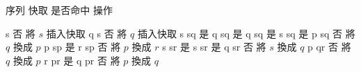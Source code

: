 
\bTABLE[
    align={middle,lohi},
    split=yes,
    header=repeat,
    offset=.25em,
]

\setupTABLE[column][1][leftframe=off]
\setupTABLE[column][-1][rightframe=off]
\setupTABLE[row][each][topframe=off,bottomframe=off]
\setupTABLE[header][each][bottomframe=on,foregroundstyle=bold]

\bTABLEhead
\bTR \bTH 序列 \eTH\bTH 快取 \eTH\bTH 是否命中 \eTH\bTH 操作 \eTH \eTR
\eTABLEhead

\bTABLEbody
\bTR \bTD s \eTD\bTD  \eTD\bTD 否 \eTD\bTD 將 $s$ 插入快取 \eTD \eTR
\bTR \bTD q \eTD\bTD s \eTD\bTD 否 \eTD\bTD 將 $q$ 插入快取 \eTD \eTR
\bTR \bTD s \eTD\bTD sq \eTD\bTD 是 \eTD\bTD \eTD \eTR
\bTR \bTD q \eTD\bTD sq \eTD\bTD 是 \eTD\bTD \eTD \eTR
\bTR \bTD q \eTD\bTD sq \eTD\bTD 是 \eTD\bTD \eTD \eTR
\bTR \bTD s \eTD\bTD sq \eTD\bTD 是 \eTD\bTD \eTD \eTR
\bTR \bTD p \eTD\bTD sq \eTD\bTD 否 \eTD\bTD 將 $q$ 換成 $p$ \eTD \eTR
\bTR \bTD p \eTD\bTD sp \eTD\bTD 是 \eTD\bTD \eTD \eTR
\bTR \bTD r \eTD\bTD sp \eTD\bTD 否 \eTD\bTD 將 $p$ 換成 $r$ \eTD \eTR
\bTR \bTD s \eTD\bTD sr \eTD\bTD 是 \eTD\bTD \eTD \eTR
\bTR \bTD s \eTD\bTD sr \eTD\bTD 是 \eTD\bTD \eTD \eTR
\bTR \bTD q \eTD\bTD sr \eTD\bTD 否 \eTD\bTD 將 $s$ 換成 $q$ \eTD \eTR
\bTR \bTD p \eTD\bTD qr \eTD\bTD 否 \eTD\bTD 將 $q$ 換成 $p$ \eTD \eTR
\bTR \bTD r \eTD\bTD pr \eTD\bTD 是 \eTD\bTD \eTD \eTR
\bTR \bTD q \eTD\bTD pr \eTD\bTD 否 \eTD\bTD 將 $p$ 換成 $q$ \eTD \eTR
\eTABLEbody

\eTABLE
